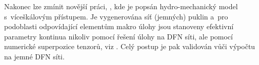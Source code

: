 \documentclass{article}
\begin{document}
Nakonec lze zmínit novější práci, \cite{Rutqvist2013}, kde je popsán hydro-mechanický model s~víceškálovým přístupem. Je vygenerována síť (jemných) 
puklin a~pro podoblasti odpovídající elementům makro úlohy jsou stanoveny efektivní parametry kontinua nikoliv pomocí řešení  úlohy na DFN síti, 
ale pomocí numerické superpozice tenzorů, viz \cite{Oda1986a}. Celý postup je pak validován vůči výpočtu na jemné DFN síti.



% 
% 
\end{document}
